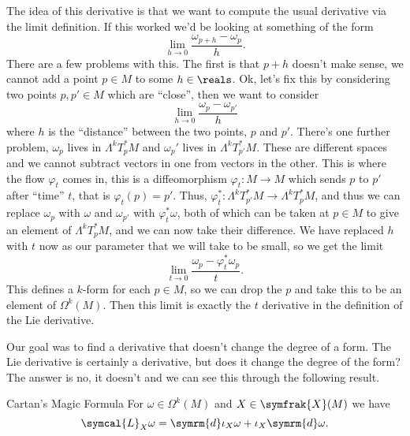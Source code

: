 \documentclass[fleqn]{NotesClass}
\renewcommand{\dl}{\symrm{d}}
\newcommand{\vectorFields}{\symfrak{X}}
\newcommand{\lieDerivative}{\symcal{L}}
\begin{document}
    The idea of this derivative is that we want to compute the usual derivative via the limit definition.
    If this worked we'd be looking at something of the form
    \begin{equation}
        \lim_{h \to 0} \frac{\omega_{p + h} - \omega_p}{h}.
    \end{equation}
    There are a few problems with this.
    The first is that \(p + h\) doesn't make sense, we cannot add a point \(p \in M\) to some \(h \in \reals\).
    Ok, let's fix this by considering two points \(p, p' \in M\) which are \enquote{close}, then we want to consider
    \begin{equation}
        \lim_{h \to 0} \frac{\omega_p - \omega_{p'}}{h}
    \end{equation}
    where \(h\) is the \enquote{distance} between the two points, \(p\) and \(p'\).
    There's one further problem, \(\omega_p\) lives in \(\Lambda^kT_p^*M\) and \(\omega_p'\) lives in \(\Lambda^kT_{p'}^*M\).
    These are different spaces and we cannot subtract vectors in one from vectors in the other.
    This is where the flow \(\varphi_t\) comes in, this is a diffeomorphism \(\varphi_t \colon M \to M\) which sends \(p\) to \(p'\) after \enquote{time} \(t\), that is \(\varphi_t(p) = p'\).
    Thus, \(\varphi_t^* \colon \Lambda^kT_{p'}^*M \to \Lambda^kT_p^*M\), and thus we can replace \(\omega_p\) with \(\omega\) and \(\omega_{p'}\) with \(\varphi_t^*\omega\), both of which can be taken at \(p \in M\) to give an element of \(\Lambda^kT_p^*M\), and we can now take their difference.
    We have replaced \(h\) with \(t\) now as our parameter that we will take to be small, so we get the limit
    \begin{equation}
        \lim_{t \to 0} \frac{\omega_p - \varphi_t^*\omega_p}{t}.
    \end{equation}
    This defines a \(k\)-form for each \(p \in M\), so we can drop the \(p\) and take this to be an element of \(\Omega^k(M)\).
    Then this limit is exactly the \(t\) derivative in the definition of the Lie derivative.
    
    Our goal was to find a derivative that doesn't change the degree of a form.
    The Lie derivative is certainly a derivative, but does it change the degree of the form?
    The answer is no, it doesn't and we can see this through the following result.
    
    \begin{thm}{Cartan's Magic Formula}{}
        For \(\omega \in \Omega^k(M)\) and \(X \in \vectorFields(M)\) we have
        \begin{equation}
            \lieDerivative_X \omega = \dl \iota_X \omega + \iota_X \dl \omega.
        \end{equation}
    \end{thm}
    
\end{document}
